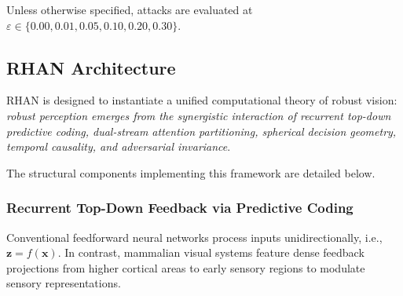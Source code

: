 \documentclass[12pt,a4paper]{article}
\begin{document}
Unless otherwise specified, attacks are evaluated at
$\varepsilon \in \{0.00, 0.01, 0.05, 0.10, 0.20, 0.30\}$.

\subsection{RHAN Architecture}
\label{sec:rhan_arch}

RHAN is designed to instantiate a unified computational theory of robust vision: \textit{robust perception emerges from the synergistic interaction of recurrent top-down predictive coding, dual-stream attention partitioning, spherical decision geometry, temporal causality, and adversarial invariance}. 

The structural components implementing this framework are detailed below.

\subsubsection{Recurrent Top-Down Feedback via Predictive Coding}
Conventional feedforward neural networks process inputs unidirectionally, i.e., $\mathbf{z} = f(\mathbf{x})$. In contrast, mammalian visual systems feature dense feedback projections from higher cortical areas to early sensory regions to modulate sensory representations. 
\end{document}
